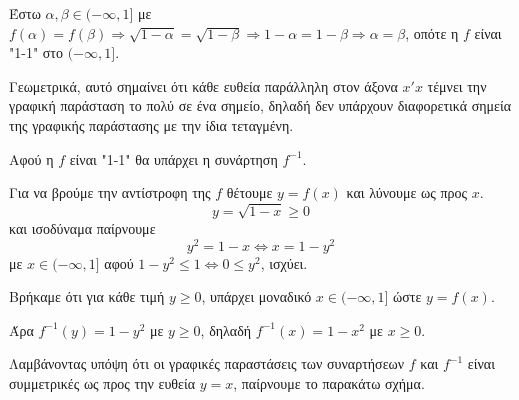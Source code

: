 \noindent {}
\begin{alist}
    \item Έστω $\alpha, \beta \in (-\infty,1]$ με $f(\alpha) = f(\beta) \Rightarrow \sqrt{1-\alpha} = \sqrt{1-\beta} \Rightarrow 1-\alpha = 1-\beta \Rightarrow \alpha = \beta$, οπότε η $f$ είναι "1-1" στο $(-\infty,1]$.
    \par Γεωμετρικά, αυτό σημαίνει ότι κάθε ευθεία παράλληλη στον άξονα $x'x$ τέμνει την γραφική παράσταση το πολύ σε ένα σημείο, δηλαδή δεν υπάρχουν διαφορετικά σημεία της γραφικής παράστασης με την ίδια τεταγμένη.
    \par Αφού η $f$ είναι "1-1" θα υπάρχει η συνάρτηση $f^{-1}$.
    \item Για να βρούμε την αντίστροφη της $f$ θέτουμε $y = f(x)$ και λύνουμε ως προς $x$.
    \[y = \sqrt{1-x} \geq 0\]
    και ισοδύναμα παίρνουμε
    \[y^2 = 1-x \Leftrightarrow x = 1-y^2\]
    με $x \in (-\infty,1]$ αφού $1-y^2 \leq 1 \Leftrightarrow 0 \leq y^2$, ισχύει.
    \par Βρήκαμε ότι για κάθε τιμή $y \geq 0$, υπάρχει μοναδικό $x \in (-\infty,1]$ ώστε $y = f(x)$.
    \par Άρα $f^{-1}(y) = 1-y^2$ με $y \geq 0$, δηλαδή $f^{-1}(x) = 1-x^2$ με $x \geq 0$.
    \item Λαμβάνοντας υπόψη ότι οι γραφικές παραστάσεις των συναρτήσεων $f$ και $f^{-1}$ είναι συμμετρικές ως προς την ευθεία $y = x$, παίρνουμε το παρακάτω σχήμα.
\end{alist}